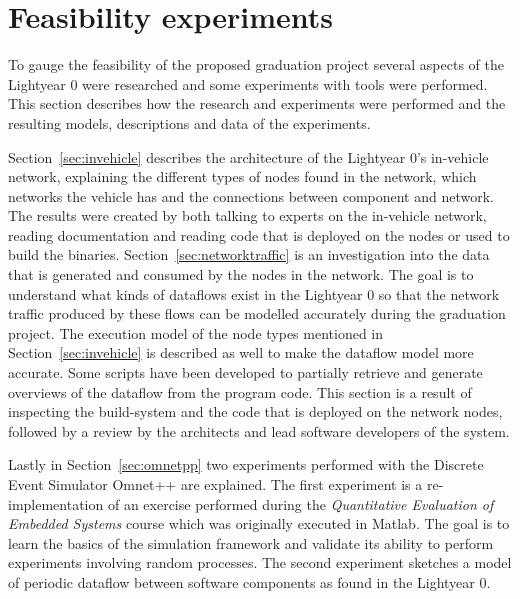 \section{Feasibility experiments}
\label{sec:feasibility}
To gauge the feasibility of the proposed graduation project several aspects of the Lightyear 0 were researched and some experiments with tools were performed. This section describes how the research and experiments were performed and the resulting models, descriptions and data of the experiments.

Section~\ref{sec:invehicle} describes the architecture of the Lightyear 0's in-vehicle network, explaining the different types of nodes found in the network, which networks the vehicle has and the connections between component and network. The results were created by both talking to experts on the in-vehicle network, reading documentation and reading code that is deployed on the nodes or used to build the binaries. 
Section~\ref{sec:networktraffic} is an investigation into the data that is generated and consumed by the nodes in the network. The goal is to understand what kinds of dataflows exist in the Lightyear 0 so that the network traffic produced by these flows can be modelled accurately during the graduation project. The execution model of the node types mentioned in Section~\ref{sec:invehicle} is described as well to make the dataflow model more accurate. Some scripts have been developed to partially retrieve and generate overviews of the dataflow from the program code. This section is a result of inspecting the build-system and the code that is deployed on the network nodes, followed by a review by the architects and lead software developers of the system.

Lastly in Section~\ref{sec:omnetpp} two experiments performed with the Discrete Event Simulator Omnet++ are explained. The first experiment is a re-implementation of an exercise performed during the \textit{Quantitative Evaluation of Embedded Systems} course which was originally executed in Matlab. The goal is to learn the basics of the simulation framework and validate its ability to perform experiments involving random processes. The second experiment sketches a model of periodic dataflow between software components as found in the Lightyear 0.


\clearpage

\clearpage


\newpage